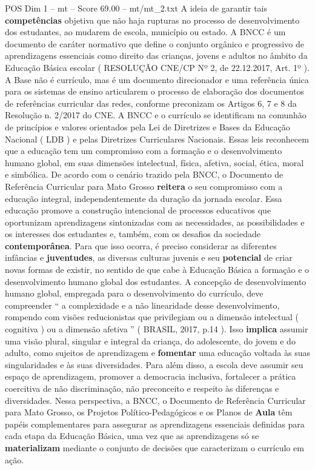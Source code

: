 \begin{textsample}{POS Dim 1 – mt – Score 69.00 – mt/mt\_2.txt}
A ideia de garantir tais \textbf{competências} objetiva que não haja rupturas no processo de desenvolvimento dos estudantes, ao mudarem de escola, município ou estado.
A BNCC é um documento de caráter normativo que define o conjunto orgânico e progressivo de aprendizagens essenciais como direito das crianças, jovens e adultos no âmbito da Educação Básica escolar ( RESOLUÇÃO CNE/CP Nº 2, de 22.12.2017, Art. 1º ).
A Base não é currículo, mas é um documento direcionador e uma referência única para os sistemas de ensino articularem o processo de elaboração dos documentos de referências curricular das redes, conforme preconizam os Artigos 6, 7 e 8 da Resolução n. 2/2017 do CNE.
A BNCC e o currículo se identificam na comunhão de princípios e valores orientados pela Lei de Diretrizes e Bases da Educação Nacional ( LDB ) e pelas Diretrizes Curriculares Nacionais.
Essas leis reconhecem que a educação tem um compromisso com a formação e o desenvolvimento humano global, em suas dimensões intelectual, física, afetiva, social, ética, moral e simbólica.
De acordo com o cenário trazido pela BNCC, o Documento de Referência Curricular para Mato Grosso \textbf{reitera} o seu compromisso com a educação integral, independentemente da duração da jornada escolar.
Essa educação promove a construção intencional de processos educativos que oportunizam aprendizagens sintonizadas com as necessidades, as possibilidades e os interesses dos estudantes e, também, com os desafios da sociedade \textbf{contemporânea}.
Para que isso ocorra, é preciso considerar as diferentes infâncias e \textbf{juventudes}, as diversas culturas juvenis e seu \textbf{potencial} de criar novas formas de existir, no sentido de que cabe à Educação Básica a formação e o desenvolvimento humano global dos estudantes.
A concepção de desenvolvimento humano global, empregada para o desenvolvimento do currículo, deve compreender “ a complexidade e a não linearidade desse desenvolvimento, rompendo com visões reducionistas que privilegiam ou a dimensão intelectual ( cognitiva ) ou a dimensão afetiva ” ( BRASIL, 2017, p.14 ).
Isso \textbf{implica} assumir uma visão plural, singular e integral da criança, do adolescente, do jovem e do adulto, como sujeitos de aprendizagem e \textbf{fomentar} uma educação voltada às suas singularidades e às suas diversidades.
Para além disso, a escola deve assumir seu espaço de aprendizagem, promover a democracia inclusiva, fortalecer a prática coercitiva de não discriminação, não preconceito e respeito às diferenças e diversidades.
Nessa perspectiva, a BNCC, o Documento de Referência Curricular para Mato Grosso, os Projetos Político-Pedagógicos e os Planos de \textbf{Aula} têm papéis complementares para assegurar as aprendizagens essenciais definidas para cada etapa da Educação Básica, uma vez que as aprendizagens só se \textbf{materializam} mediante o conjunto de decisões que caracterizam o currículo em ação.

\end{textsample}
